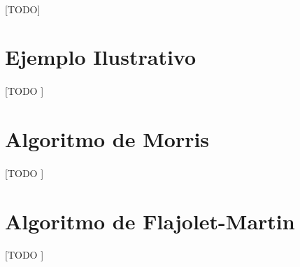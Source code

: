 \documentclass{subfiles}
\begin{document}
        \paragraph{}
        [TODO]


    \section{Ejemplo Ilustrativo}
    \label{sec:streaming_puzzle}

      \paragraph{}
      [TODO ]


    \section{Algoritmo de Morris}
    \label{sec:streaming_morris_algorithm}

      \paragraph{}
      [TODO ]


    \section{Algoritmo de Flajolet-Martin}
    \label{sec:streaming_morris_algorithm}

      \paragraph{}
      [TODO ]
\end{document}

